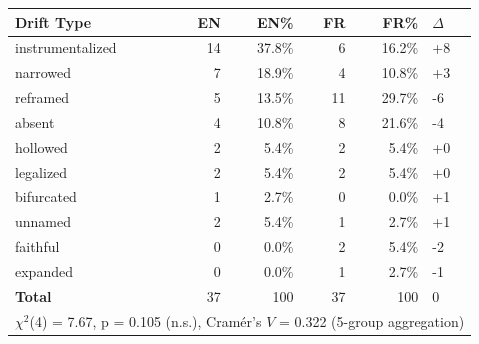 \begin{tabular}{lrrrrl}
\toprule
Drift Type & EN & EN\% & FR & FR\% & $\Delta$ \\
\midrule
  instrumentalized & 14 & 37.8\% & 6 & 16.2\% & +8 \\
  narrowed & 7 & 18.9\% & 4 & 10.8\% & +3 \\
  reframed & 5 & 13.5\% & 11 & 29.7\% & -6 \\
  absent & 4 & 10.8\% & 8 & 21.6\% & -4 \\
  hollowed & 2 & 5.4\% & 2 & 5.4\% & +0 \\
  legalized & 2 & 5.4\% & 2 & 5.4\% & +0 \\
  bifurcated & 1 & 2.7\% & 0 & 0.0\% & +1 \\
  unnamed & 2 & 5.4\% & 1 & 2.7\% & +1 \\
  faithful & 0 & 0.0\% & 2 & 5.4\% & -2 \\
  expanded & 0 & 0.0\% & 1 & 2.7\% & -1 \\
\midrule
  \textbf{Total} & 37 & 100 & 37 & 100 & 0 \\
\bottomrule
\multicolumn{6}{l}{\footnotesize $\chi^2$(4) = 7.67, p = 0.105 (n.s.), Cram\'er's $V$ = 0.322 (5-group aggregation)}
\end{tabular}
